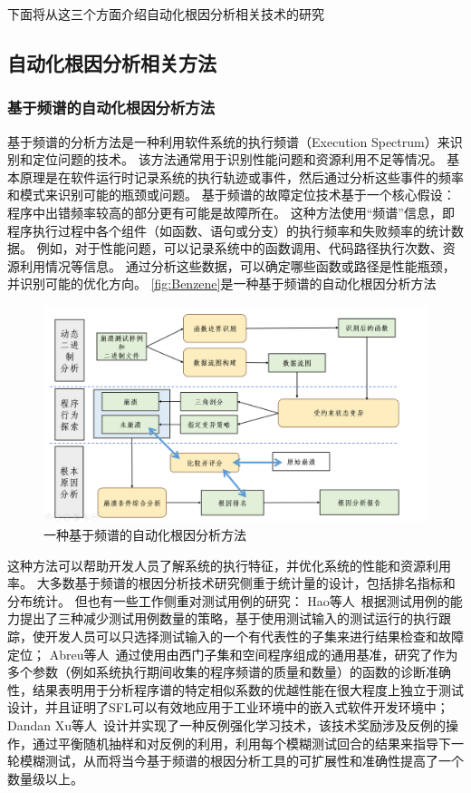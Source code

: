 下面将从这三个方面介绍自动化根因分析相关技术的研究
\subsection{自动化根因分析相关方法}
\subsubsection{基于频谱的自动化根因分析方法}
基于频谱的分析方法是一种利用软件系统的执行频谱（Execution Spectrum）来识别和定位问题的技术。
该方法通常用于识别性能问题和资源利用不足等情况。
基本原理是在软件运行时记录系统的执行轨迹或事件，然后通过分析这些事件的频率和模式来识别可能的瓶颈或问题。
基于频谱的故障定位技术基于一个核心假设：程序中出错频率较高的部分更有可能是故障所在。
这种方法使用“频谱”信息，即程序执行过程中各个组件（如函数、语句或分支）的执行频率和失败频率的统计数据。
例如，对于性能问题，可以记录系统中的函数调用、代码路径执行次数、资源利用情况等信息。
通过分析这些数据，可以确定哪些函数或路径是性能瓶颈，并识别可能的优化方向。
\autoref{fig:Benzene}是一种基于频谱的自动化根因分析方法~\cite{BENZENE}
\begin{figure}[h]
    \centering
    \includegraphics[width=1.0\textwidth]{./figure/Benzene.png}
    \caption{一种基于频谱的自动化根因分析方法}
    \label{fig:Benzene}
\end{figure}


这种方法可以帮助开发人员了解系统的执行特征，并优化系统的性能和资源利用率。
大多数基于频谱的根因分析技术研究侧重于统计量的设计，包括排名指标和分布统计。
但也有一些工作侧重对测试用例的研究：
Hao等人~\cite{Test2010}根据测试用例的能力提出了三种减少测试用例数量的策略，基于使用测试输入的测试运行的执行跟踪，使开发人员可以只选择测试输入的一个有代表性的子集来进行结果检查和故障定位；
Abreu等人~\cite{practical2009}通过使用由西门子集和空间程序组成的通用基准，研究了作为多个参数（例如系统执行期间收集的程序频谱的质量和数量）的函数的诊断准确性，结果表明用于分析程序谱的特定相似系数的优越性能在很大程度上独立于测试设计，并且证明了SFL可以有效地应用于工业环境中的嵌入式软件开发环境中；
Dandan Xu等人~\cite{Racing}设计并实现了一种反例强化学习技术，该技术奖励涉及反例的操作，通过平衡随机抽样和对反例的利用，利用每个模糊测试回合的结果来指导下一轮模糊测试，从而将当今基于频谱的根因分析工具的可扩展性和准确性提高了一个数量级以上。

